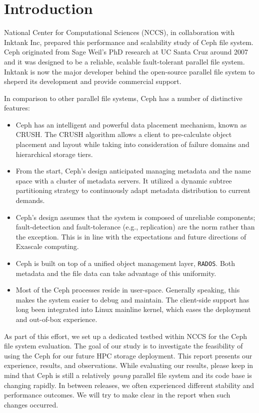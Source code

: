 \section{Introduction}

National Center for Computational Sciences (NCCS), in collaboration with
Inktank Inc, prepared this performance and scalability study of
Ceph file system. Ceph originated from Sage Weil's PhD research
at UC Santa Cruz around 2007 and it was designed to be a reliable, scalable
fault-tolerant parallel file system. Inktank is now the major developer behind
the open-source parallel file system to sheperd its development and provide
commercial support.

In comparison to other parallel file systems, Ceph has a number of distinctive
features:

\begin{itemize}
 
\item Ceph has an intelligent and powerful data placement mechanism, known as
  CRUSH. The CRUSH algorithm allows a client to pre-calculate object
  placement and layout while taking into consideration of failure domains and
  hierarchical storage tiers.
  
\item From the start, Ceph's design anticipated managing metadata and the name space
  with a cluster of metadata servers. It utilized a dynamic subtree partitioning
  strategy to continuously adapt metadata distribution to current demands.

\item Ceph's design assumes that the system is composed of unreliable
components; fault-detection and fault-tolerance (e.g., replication) are the
norm rather than the exception. This is in line with the expectations and
future directions of Exascale computing.

\item Ceph is built on top of a unified object management layer,
\texttt{RADOS}. Both metadata and the file data can take advantage of this
uniformity.

\item Most of the Ceph processes reside in user-space. Generally speaking, this makes the
system easier to debug and maintain. The client-side support has long been
integrated into Linux mainline kernel, which eases the deployment and out-of-box
experience.

\end{itemize}


As part of this effort, we set up a dedicated testbed within NCCS for the Ceph
file system evaluation. The goal of our study is to investigate the
feasibility of using the Ceph for our future HPC storage deployment.  This
report presents our experience, results, and observations. While evaluating
our results, please keep in mind that Ceph is still a relatively
\textit{young} parallel file system and its code base is changing rapidly. In
between releases, we often experienced different stability and performance
outcomes.  We will try to make clear in the report when such changes occurred.

